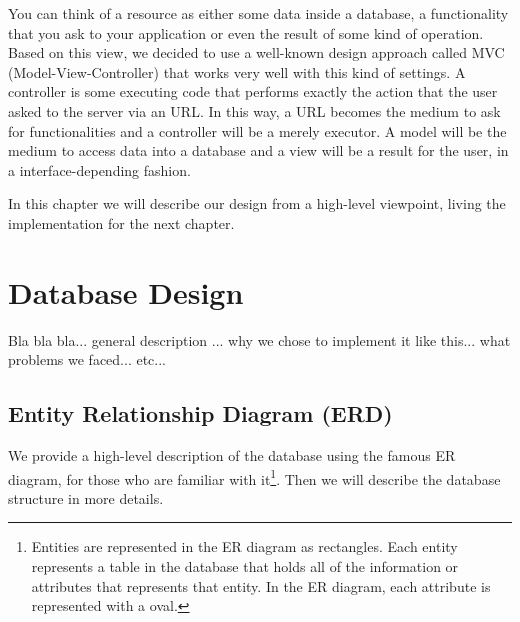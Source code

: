 \documentclass[12pt]{report}
\begin{document}
You can think of a resource as either some data inside a database, a functionality that you ask to your application or even the result of some kind of operation. Based on this view, we decided to use a well-known design approach called MVC (Model-View-Controller) that works very well with this kind of settings. A controller is some executing code that performs exactly the action that the user asked to the server via an URL. In this way, a URL becomes the medium to ask for functionalities and a controller will be a merely executor. A model will be the medium to access data into a database and a view will be a result for the user, in a interface-depending fashion.

In this chapter we will describe our design from a high-level viewpoint, living the implementation for the next chapter.

\section{Database Design}
Bla bla bla... general description ... why we chose to implement it like this... what problems we faced... etc...

\subsection{Entity Relationship Diagram (ERD)}
We provide a high-level description of the database using the famous ER diagram, for those who are familiar with it\footnote{Entities are represented in the ER diagram as rectangles.  Each entity represents a table in the database that holds all of the information or attributes that represents that entity.  In the ER diagram, each attribute is represented with a oval.}. Then we will describe the database structure in more details.
\end{document}
